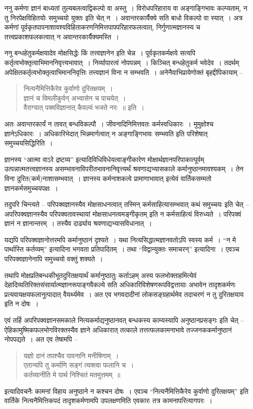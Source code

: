{ननु कर्मणा ज्ञानं बाध्यतां तुल्यबलत्वाद्विकल्पो वा अस्तु~। विरोधपरिहाराय वा अङ्गाङ्गिभावः कल्प्यताम्, न तु निरपेक्षविहितयोः समुच्चयो युक्तः इति चेत् न~। अवान्तरकार्यैक्ये सति बाधो विकल्पो वा स्यात्~। अत्र कर्मणां पूर्वकृतपापनाशावश्यविहिताकरणनिमित्तपापपरिहार\-फलत्वात्, निर्गुणात्मज्ञानस्य च तत्त्वप्रकाशफलकत्वात् न अवान्तरकार्यैक्यमस्ति~। 

ननु बन्धहेतुकर्मक्षयादेव मोक्षसिद्धेः किं तत्त्वज्ञानेन इति चेन्न~। पूर्वकृतकर्मक्षये सत्यपि कर्तृत्वभोक्तृत्वाभिमाननिवृत्त्यभावात्~। निर्व्यापारत्वं नोपपन्नम्~। किञ्चित् बन्धहेतुकर्म भवेदेव~। तदर्थम् अपेक्षितकर्तृत्वभोक्तृत्वाभिमाननिवृत्तिः तत्त्वज्ञानं विना न सम्भवति~। अनेनैवाभिप्रायेणोक्तं बृहद्दीपिकायाम् –
\begin{verse}
नित्यनैमित्तिकैरेव कुर्वाणो दुरितक्षयम्~। \\
ज्ञानं च विमलीकुर्वन् अभ्यासेन च पाचयेत्~। \\
वैराग्यात् पक्वविज्ञानात् कैवल्यं भजते नरः~॥ इति~। 
\end{verse}
अतः अवान्तरकार्यं न तावत् बन्धविकल्पौ~। जीवनादिनिमित्तवतः कर्मस्वधिकारः~। मुमुक्षोश्च ज्ञानेऽधिकारः~। अधिकारिभेदात् भिन्नमार्गत्वात् न अङ्गाङ्गिभावः सम्भवति इति परिशेषात् समुच्चयसिद्धिरिति~। 

ज्ञानस्य “आत्मा वाऽरे द्रष्टव्य” इत्यादिविधिविधेयत्वाङ्गीकारेण मोक्षार्थज्ञानपरिपा\-कात्पूर्वम् उत्पन्नात्मतत्त्वज्ञानस्य असम्भावनाविपरीतभावनानिवृत्त्यर्थं श्रवणाद्यभ्यासकाले कर्मानुष्ठानमावश्यकम्~। तेन विना दुरित(कर्म)नाशासम्भवात्~। ज्ञानस्य कर्मनाशकत्वे प्रामाणाभावात् इत्येवं वार्तिकसम्मतो ज्ञानकर्मसमुच्चयपक्षः~। 

तदुपरि चिन्त्यते – परिपक्वज्ञानस्यैव मोक्षसाधनत्वात् तस्मिन् कर्मसाहित्यासम्भवात् कथं समुच्चयः इति चेत् – अपरिपक्वज्ञानस्यैव परिपक्वतावस्थायां मोक्षसाधनत्वमङ्गीकृतम् इति न कर्मसाहित्यं विरुध्यते~। परिपक्वं ज्ञानं न ज्ञानान्तरम्~। तस्यैव दार्ढ्याय श्रवणाद्यभ्यासविधानात्~। 

यद्यपि परिपक्वज्ञानोत्तरमपि कर्मानुष्ठानं दृश्यते~। यथा नित्यसिद्धात्मज्ञानवतोऽपि स्वस्य कर्म~। “न मे पार्थास्ति कर्तव्यम्” इत्यादिना भगवता प्रतिपादितम्~। तथा “विद्वान्युक्तः समाचरन्” इत्यादिना~। एवञ्च परिपक्वज्ञानेनापि समुच्चयो वक्तुं शक्यते~। 

तथापि मोक्षप्रतिबन्धकीभूतदुरितक्षयार्थं कर्मानुष्ठातुः कर्ताऽहम् अस्य फलभोक्ताहमित्येवं देहादिव्यतिरिक्तसंसार्यात्मज्ञानरूपाङ्गवैकल्ये सति अधिकारिविशेषणरूपविद्वत्तायाः अभावेन तादृशकर्मणः प्रत्यवायक्षयफलानुत्पादात् वैयर्थ्यमेव~। अत एव भगवदादीनां लोकसङ्ग्रहार्थमेव तदाचरणं न तु दुरितक्षयाय इति न दोषः~। 

एवं तर्हि अपरिपक्वज्ञानसमकाले नित्यकर्माद्यनुष्ठानवत् बन्धकस्य काम्यस्यापि अनुष्ठान\-प्रसङ्गः इति चेत् – ऐहिकामुष्मिकफलभोगविरक्तस्यैव ज्ञाने अधिकारात् तत्काले तत्तत्फलकामनाभावे तज्जनककर्मानुष्ठानं नोपपद्यते~। अत एव तेषामपि –
\begin{verse}
यज्ञो दानं तपश्चैव पावनानि मनीषिणाम्~। \\
एतान्यपि तु कर्माणि सङ्गं त्यक्त्वा फलानि च~। \\
कर्तव्यानीति मे पार्थ निश्चितं मतमुत्तमम्~॥
\end{verse}
इत्यादिवचनैः कामनां विहाय अनुष्ठाने न कश्चन दोषः~। एवञ्च “नित्यनैमित्तिकैरेव कुर्वाणो दुरितक्षयम्” इति वार्तिके नित्यनैमित्तिकपदं तादृशकर्मणामपि उपलक्षणमिति एवकारः तत्र कामनापरित्यागपरः~। 

}
